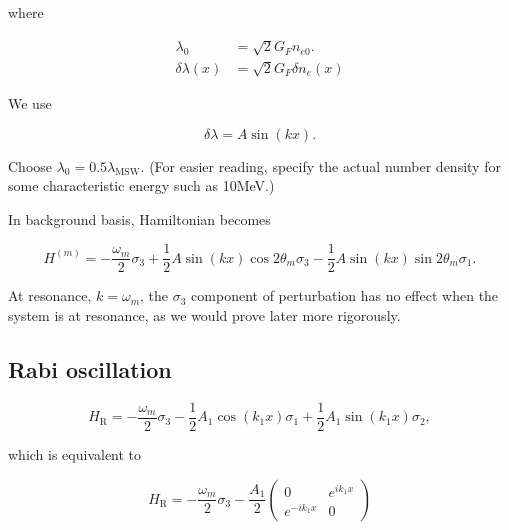 \documentclass[%
preprint,
 amsmath,amssymb,
 aps,
]{revtex4-1}
\begin{document}
where

\begin{align}
    \lambda_0 &= \sqrt{2}G_F n_{e0}. \\
    \delta \lambda (x) &= \sqrt{2}G_F \delta n_{e}(x)
\end{align}

We use

\begin{equation}
\delta \lambda = A \sin (k x).
\end{equation}




Choose $\lambda_0 = 0.5\lambda_{\mathrm{MSW}}$. (For easier reading, specify the actual number density for some characteristic energy such as 10\;MeV.)


In background basis, Hamiltonian becomes

\begin{equation}
    H^{(m)} = - \frac{\omega_m}{2} \sigma_3 + \frac{1}{2}A \sin (k x) \cos 2\theta_m \sigma_3 - \frac{1}{2}A\sin(kx) \sin 2 \theta_m \sigma_1.
\end{equation}


At resonance, $k=\omega_m$, the $\sigma_3$ component of perturbation has no effect when the system is at resonance, as we would prove later more rigorously.







\subsection{Rabi oscillation}

\begin{equation}
H_{\mathrm R} = -\frac{\omega_m}{2} \sigma_3 - \frac{1}{2}A_1 \cos(k_1 x) \sigma_1 + \frac{1}{2} A_1 \sin(k_1 x) \sigma_2,
\end{equation}

which is equivalent to

\begin{equation}
H_{\mathrm R} = -\frac{\omega_m}{2} \sigma_3 - \frac{A_1}{2} \begin{pmatrix}0 & e^{i k_1 x} \\ e^{-i k_1 x} & 0 \end{pmatrix} 
\end{equation}
\end{document}
